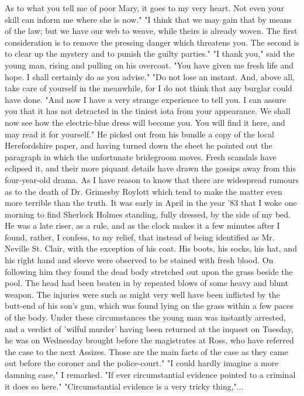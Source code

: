 \documentclass[11pt]{article}
\begin{document}
\begin{enumerate}
As to what you tell me of poor Mary, it goes to my very heart. Not even your skill can inform me where she is now." "I think that we may gain that by means of the law; but we have our web to weave, while theirs is already woven. The first consideration is to remove the pressing danger which threatens you. The second is to clear up the mystery and to punish the guilty parties." "I thank you," said the young man, rising and pulling on his overcoat. "You have given me fresh life and hope. I shall certainly do as you advise." "Do not lose an instant. And, above all, take care of yourself in the meanwhile, for I do not think that any burglar could have done. "And now I have a very strange experience to tell you. I can assure you that it has not detracted in the tiniest iota from your appearance. We shall now see how the electric-blue dress will become you. You will find it here, and may read it for yourself." He picked out from his bundle a copy of the local Herefordshire paper, and having turned down the sheet he pointed out the paragraph in which the unfortunate bridegroom moves. Fresh scandals have eclipsed it, and their more piquant details have drawn the gossips away from this four-year-old drama. As I have reason to know that there are widespread rumours as to the death of Dr. Grimesby Roylott which tend to make the matter even more terrible than the truth. It was early in April in the year '83 that I woke one morning to find Sherlock Holmes standing, fully dressed, by the side of my bed. He was a late riser, as a rule, and as the clock makes it a few minutes after I found, rather, I confess, to my relief, that instead of being identified as Mr. Neville St. Clair, with the exception of his coat. His boots, his socks, his hat, and his right hand and sleeve were observed to be stained with fresh blood. On following him they found the dead body stretched out upon the grass beside the pool. The head had been beaten in by repeated blows of some heavy and blunt weapon. The injuries were such as might very well have been inflicted by the butt-end of his son's gun, which was found lying on the grass within a few paces of the body. Under these circumstances the young man was instantly arrested, and a verdict of 'wilful murder' having been returned at the inquest on Tuesday, he was on Wednesday brought before the magistrates at Ross, who have referred the case to the next Assizes. Those are the main facts of the case as they came out before the coroner and the police-court." "I could hardly imagine a more damning case," I remarked. "If ever circumstantial evidence pointed to a criminal it does so here." "Circumstantial evidence is a very tricky thing,"...


\end{enumerate}
\end{document}
